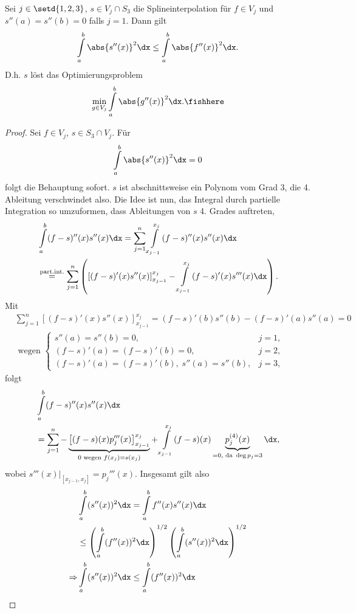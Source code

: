 \begin{prop}[Optimalitätskriterium]
\label{prop:3.6}
Sei $j\in\setd{1,2,3}$, $s\in V_j\cap S_3$ die Splineinterpolation für $f\in
V_j$ und $s''(a) = s''(b)=0$ falls $j=1$. Dann gilt
\begin{align*}
\int\limits_a^b \abs{s''(x)}^2 \dx \le \int\limits_a^b \abs{f''(x)}^2 \dx.
\end{align*}
D.h. $s$ löst das Optimierungsproblem
\begin{align*}
\min\limits_{g\in V_j} \int\limits_{a}^b \abs{g''(x)}^2 \dx.\fishhere
\end{align*}
\end{prop}
\begin{proof}
Sei $f\in V_j$, $s\in S_3\cap V_j$. Für
\begin{align*}
\int\limits_a^b \abs{s''(x)}^2 \dx = 0
\end{align*}
folgt die Behauptung sofort. $s$ ist abschnittsweise ein Polynom vom
Grad 3, die 4. Ableitung verschwindet also. Die Idee ist nun, das Integral durch
partielle Integration so umzuformen, dass Ableitungen von $s$ 4. Grades
auftreten,
\begin{align*}
&\int\limits_a^b (f-s)''(x)s''(x)\dx = 
\sum\limits_{j=1}^n \int\limits_{x_{j-1}}^{x_j} (f-s)''(x)s''(x)\dx\\
&\overset{\small\text{part.int.}}{=} 
\sum\limits_{j=1}^n \left(\left[(f-s)'(x)s''(x) \right]_{x_{j-1}}^{x_j}
- \int\limits_{x_{j-1}}^{x_j} (f-s)'(x)s'''(x)\dx\right).
\end{align*}
Mit
\begin{align*}
&\sum\limits_{j=1}^n\left[(f-s)'(x)s''(x) \right]_{x_{j-1}}^{x_j}
= (f-s)'(b)s''(b)-(f-s)'(a)s''(a) = 0 \\ &
\text{ wegen }
\begin{cases}
s''(a)=s''(b) = 0, & j=1,\\
(f-s)'(a) = (f-s)'(b)=0, & j=2,\\
(f-s)'(a) = (f-s)'(b),\; s''(a)=s''(b), & j=3,
\end{cases}
\end{align*}
folgt
\begin{align*}
&\int\limits_a^b (f-s)''(x)s''(x)\dx \\ &= 
\sum\limits_{j=1}^n
-\underbrace{\left[(f-s)(x)p_j'''(x) \right]_{x_{j-1}}^{x_j}}_{0\text{ wegen
} f(x_j)=s(x_j)} + \int\limits_{x_{j-1}}^{x_j}
(f-s)(x)\underbrace{p_j^{(4)}(x)}_{=0,\text{ da }\deg p_j = 3}\dx,
\end{align*}
wobei $s'''(x)\big|_{[x_{j-1},x_j]} = p_j'''(x)$. Insgesamt gilt also
\begin{align*}
&\int\limits_a^b (s''(x))^2 \dx = \int\limits_a^b f''(x)s''(x)\dx\\
&\le \left(\int\limits_a^b (f''(x))^2\dx\right)^{1/2} \left(\int\limits_a^b
(s''(x))^2\dx\right)^{1/2}\\
\Rightarrow &\int\limits_a^b (s''(x))^2 \dx \le \int\limits_a^b (f''(x))^2
\dx\qedhere
\end{align*}
\end{proof}

